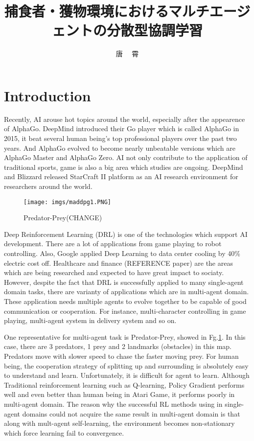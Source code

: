 \documentclass[11pt,twocolumn]{jarticle} %
\title{捕食者・獲物環境におけるマルチエージェントの分散型協調学習}
\author{唐 \ \ 霄}
\begin{document}
\maketitle
\thispagestyle{iitheader}
\section{Introduction}
Recently, AI arouse hot topics around the world, especially after the appearence of AlphaGo\cite{alphago}. DeepMind introduced their Go player which is called AlphaGo in 2015, it beat several human being's top professional players over the past two years. And AlphaGo evolved to become nearly unbeatable versions which are AlphaGo Master and AlphaGo Zero\cite{alphagozero}. AI not only contribute to the application of traditional sports, game is also a big area which studies are ongoing. DeepMind and Blizzard released StarCraft II platform as an AI research environment\cite{starcraft} for researchers around the world.\par

\begin{figure}[t]
 \begin{center}
  \texttt{[image: imgs/maddpg1.PNG]}
  \caption{Predator-Prey(CHANGE)}
  \label{fig:adversaryChasing}
 \end{center}
\end{figure}

Deep Reinforcement Learning (DRL) is one of the technologies which support AI development. There are a lot of applications from game playing\cite{game} to robot controlling\cite{robot}. Also, Google applied Deep Learning to data center cooling by 40\%\cite{google} electric cost off. Healthcare and finance (REFERENCE paper) are the areas which are being researched and expected to have great impact to sociaty. However, despite the fact that DRL is successfully applied to many single-agent domain tasks, there are varianty of applications which are in multi-agent domain. These application needs multiple agents to evolve together to be capable of good communication or cooperation. For instance, multi-character controlling in game playing, multi-agent system in delivery system and so on.


One representative for multi-agent task is Predator-Prey\cite{maddpg}, showed in Fg.\ref{fig:adversaryChasing}. In this case, there are 3 predators, 1 prey and 2 landmarks (obstacles) in this map. Predators move with slower speed to chase the faster moving prey. For human being, the cooperation strategy of splitting up and surrounding is absolutely easy to understand and learn. Unfortunately, it is difficult for agent to learn. Although Traditional reinforcement learning such as Q-learning\cite{qlearning}, Policy Gradient\cite{pg} performs well and even better than human being in Atari Game\cite{ddpg}, it performs poorly in multi-agent domain. The reason why the successful RL methods using in single-agent domains could not acquire the same result in multi-agent domain is that along with mult-agent self-learning, the environment becomes non-stationary which force learning fail to convergence. \par
\end{document}
